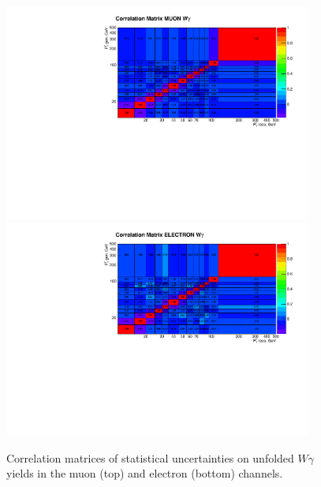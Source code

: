 \begin{figure}[htb]
  \begin{center}
   \includegraphics[width=0.90\textwidth]{../figs/figs_v11/MUON_WGamma/Constants/matrCorrelation_yield_pm_stat.pdf}\\
\includegraphics[width=0.90\textwidth]{../figs/figs_v11/ELECTRON_WGamma/Constants/matrCorrelation_yield_pm_stat.pdf}
  \caption{Correlation matrices of statistical uncertainties on unfolded $W\gamma$ yields in the muon (top) and electron (bottom) channels.}
  \label{fig:corrMatrices_Wg}
  \end{center}
\end{figure}



